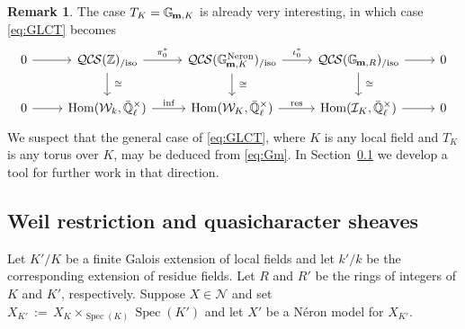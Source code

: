 \documentclass[10pt]{amsart}
\theoremstyle{plain}
\theoremstyle{definition}
\newtheorem{remark}[theorem]{Remark}
\newcommand{\ZZ}{{\mathbb{Z}}}
\newcommand{\NN}{{\mathbb{N}}}
\newcommand{\EE}{\mathbb{\bar Q}_\ell}
\newcommand{\bFq}{\bar{k}}
\newcommand{\Fq}{k}
\newcommand{\EEx}{\EE^\times}
\newcommand{\Weil}[1]{\mathcal{W}_{#1}}
\newcommand{\Gm}[1]{\mathbb{G}_{\hskip-1pt\textbf{m},#1}}
\DeclareMathOperator{\Hom}{Hom}
\DeclareMathOperator{\Gr}{Gr}
\newcommand{\Spec}[1]{{\operatorname{Spec}(#1)}}
\newcommand{\ceq}{{\, :=\, }}
\newcommand{\iso}{{\ \cong\ }}
\newcommand{\QCS}{{\mathcal{QC\hskip-0.8pt S}}}
\newcommand{\QCSiso}[1]{\QCS(#1)_{/\text{iso}}}
\begin{document}
\begin{remark}
The case $T_K = \Gm{K}$ is already very interesting, in which case \eqref{eq:GLCT} becomes
\begin{equation}\label{eq:Gm}
\begin{tikzcd}
    0 \rar & \QCSiso{\ZZ} \arrow{r}{\pi_0^*} \arrow{d}{\iso}
    & \QCSiso{\Gm{K}^\text{Neron}} \arrow{r}{\iota_0^*}  \arrow{d}{\iso} & \QCSiso{\Gm{R}} \arrow{r} \arrow{d}{\iso} & 0\\
    0 \arrow{r}  
 & \Hom(\Weil{\Fq}, \EEx) \arrow{r}{\text{inf}}
 & \Hom(\Weil{K}, \EEx) \arrow{r}{\text{res}} 
 & \Hom(\mathcal{I}_K, \EEx) \arrow{r}  
 & 0
\end{tikzcd}
\end{equation}
We suspect that the general case of \eqref{eq:GLCT}, where $K$ is any local field and $T_K$ is any
torus over $K$, may be deduced from \eqref{eq:Gm}.
In Section~\ref{ssec:wrK} we develop a tool for further work in that direction.
\end{remark}


\subsection{Weil restriction and quasicharacter sheaves}\label{ssec:wrK}

Let $K'/K$ be a finite Galois extension of local fields and
let $k'/k$ be the corresponding extension of residue fields.
Let $R$ and $R'$ be the rings of integers of $K$ and $K'$, respectively.
Suppose $X \in \mathcal{N}$ and set $X_{K'} \ceq X_K \times_\Spec{K} \Spec{K'}$
and let $X'$ be a N\'eron model for $X_{K'}$.
\end{document}
